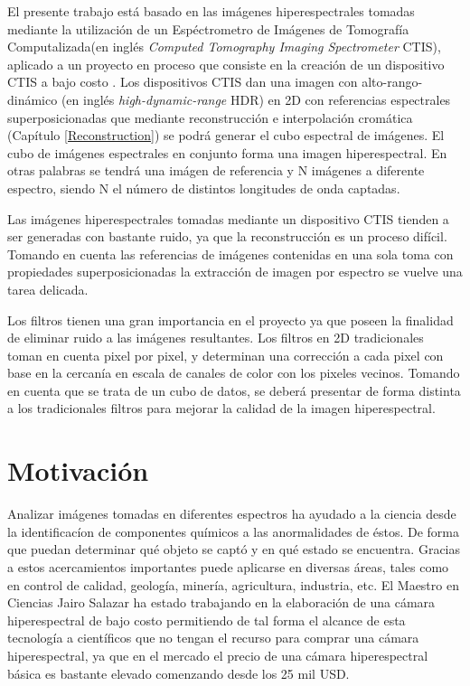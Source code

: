 El presente trabajo está basado en las imágenes hiperespectrales tomadas mediante la utilización de  un Espéctrometro de Imágenes de Tomografía Computalizada(en inglés \textit{Computed Tomography Imaging Spectrometer} CTIS), aplicado a un proyecto en proceso que consiste en la creación de un dispositivo CTIS a bajo costo \cite{JairoCamera}.
Los dispositivos CTIS dan una imagen con alto-rango-dinámico (en inglés \textit{high-dynamic-range} HDR) en 2D con referencias espectrales superposicionadas que mediante reconstrucción e interpolación cromática (Capítulo \ref{Reconstruction}) se podrá generar el cubo espectral de imágenes.
El cubo de imágenes espectrales en conjunto forma una imagen hiperespectral. 
En otras palabras se tendrá una imágen de referencia y N imágenes a diferente espectro, siendo N el número de distintos longitudes de onda captadas.

Las imágenes hiperespectrales tomadas mediante un dispositivo CTIS tienden a ser generadas con bastante ruido, ya que la reconstrucción es un proceso difícil. Tomando en cuenta las referencias de imágenes contenidas en una sola toma con propiedades superposicionadas la extracción de imagen por espectro se vuelve una tarea delicada. \cite{NoiseEstimation}\cite{NoiseEstimation2}\cite{extra1}

Los filtros tienen una gran importancia en el proyecto ya que poseen la finalidad de eliminar ruido a las imágenes resultantes. 
Los filtros en  2D tradicionales toman en cuenta pixel por pixel, y determinan una corrección a cada pixel con base en la cercanía en escala de canales de color con los pixeles vecinos.
Tomando en cuenta que se trata de un cubo de datos, se deberá presentar de forma distinta a los tradicionales filtros para mejorar la calidad de la imagen hiperespectral.

\section{Motivación}

Analizar imágenes tomadas en diferentes espectros ha ayudado a la ciencia desde la identificacíon de componentes químicos a las anormalidades de éstos. De forma que puedan determinar qué objeto se captó y en qué estado se encuentra. 
Gracias a estos acercamientos importantes puede aplicarse en diversas áreas, tales como en control de calidad, geología, minería, agricultura, industria, etc\cite{Applications}.
El Maestro en Ciencias Jairo Salazar ha estado trabajando en la elaboración de una cámara hiperespectral de bajo costo\cite{JairoCamera}
permitiendo de tal forma el alcance de esta tecnología a científicos que no tengan el recurso para comprar una cámara hiperespectral, ya que en el mercado el precio de una cámara hiperespectral básica es bastante elevado comenzando desde los 25 mil USD. 

